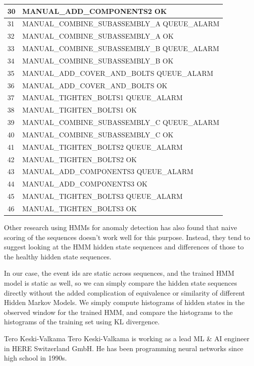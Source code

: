\documentclass[journal]{IEEEtran}
\begin{document}
\begin{table}[!t]
\begin{tabular}{|p{5mm}|p{55mm}|}
\hline
30 & MANUAL\_ADD\_COMPONENTS2 OK \\
\hline
31 & MANUAL\_COMBINE\_SUBASSEMBLY\_A QUEUE\_ALARM \\
\hline
32 & MANUAL\_COMBINE\_SUBASSEMBLY\_A OK \\
\hline
33 & MANUAL\_COMBINE\_SUBASSEMBLY\_B QUEUE\_ALARM \\
\hline
34 & MANUAL\_COMBINE\_SUBASSEMBLY\_B OK \\
\hline
35 & MANUAL\_ADD\_COVER\_AND\_BOLTS QUEUE\_ALARM \\
\hline
36 & MANUAL\_ADD\_COVER\_AND\_BOLTS OK \\
\hline
37 & MANUAL\_TIGHTEN\_BOLTS1 QUEUE\_ALARM \\
\hline
38 & MANUAL\_TIGHTEN\_BOLTS1 OK \\
\hline
39 & MANUAL\_COMBINE\_SUBASSEMBLY\_C QUEUE\_ALARM \\
\hline
40 & MANUAL\_COMBINE\_SUBASSEMBLY\_C OK \\
\hline
41 & MANUAL\_TIGHTEN\_BOLTS2 QUEUE\_ALARM \\
\hline
42 & MANUAL\_TIGHTEN\_BOLTS2 OK \\
\hline
43 & MANUAL\_ADD\_COMPONENTS3 QUEUE\_ALARM \\
\hline
44 & MANUAL\_ADD\_COMPONENTS3 OK \\
\hline
45 & MANUAL\_TIGHTEN\_BOLTS3 QUEUE\_ALARM \\
\hline
46 & MANUAL\_TIGHTEN\_BOLTS3 OK \\
\hline
\end{tabular}
\end{table}

Other research using HMMs for anomaly detection has also found that naive scoring of the sequences doesn't work well for this purpose\cite{gornitz2015hidden}. Instead, they tend to suggest looking at the HMM hidden state sequences and differences of those to the healthy hidden state sequences.

In our case, the event ids are static across sequences, and the trained HMM model is static as well, so we can simply compare the hidden state sequences directly without the added complication of equivalence or similarity of different Hidden Markov Models. We simply compute histograms of hidden states in the observed window for the trained HMM, and compare the histograms to the histograms of the training set using KL divergence.

\appendices




\begin{IEEEbiography}{Tero Keski-Valkama}
Tero Keski-Valkama is working as a lead ML \& AI engineer in HERE Switzerland GmbH. He has been programming neural networks since high school in 1990s.
\end{IEEEbiography}
\end{document}
